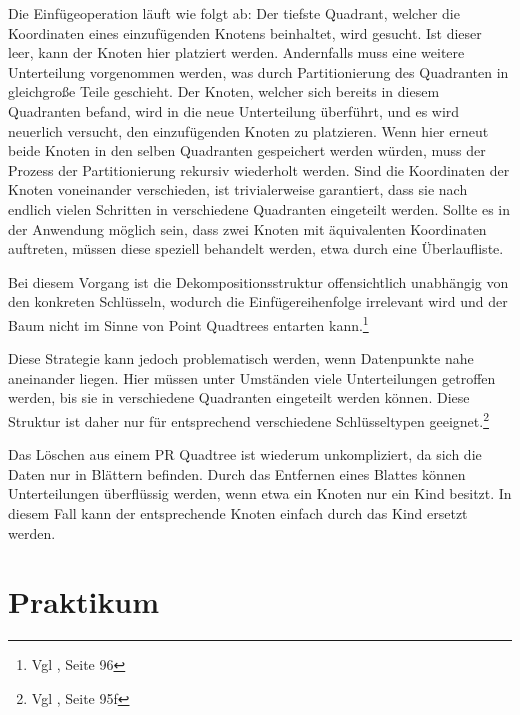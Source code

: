 \documentclass[%
			paper=a4,%
			DIV12,
			liststotoc,
			bibtotoc,
			draft=false,%
			titlepage,
			numbers=noendperiod
			]{scrartcl}
\newcommand{\zit}[3]{#1 \cite{#2}, #3}
\newcommand{\footzit}[3]{\footnote{\zit{#1}{#2}{#3}}}
\begin{document}
Die Einfügeoperation läuft wie folgt ab:
Der tiefste Quadrant, welcher die Koordinaten eines einzufügenden Knotens beinhaltet, wird gesucht.
Ist dieser leer, kann der Knoten hier platziert werden.
Andernfalls muss eine weitere Unterteilung vorgenommen werden, was durch Partitionierung des Quadranten in gleichgroße Teile geschieht. 
Der Knoten, welcher sich bereits in diesem Quadranten befand, wird in die neue Unterteilung überführt, und es wird neuerlich versucht, den einzufügenden Knoten zu platzieren. 
Wenn hier erneut beide Knoten in den selben Quadranten gespeichert werden würden, muss der Prozess der Partitionierung rekursiv wiederholt werden.
Sind die Koordinaten der Knoten voneinander verschieden, ist trivialerweise garantiert, dass sie nach endlich vielen Schritten in verschiedene Quadranten eingeteilt werden. 
Sollte es in der Anwendung möglich sein, dass zwei Knoten mit äquivalenten Koordinaten auftreten, müssen diese speziell behandelt werden, etwa durch eine Überlaufliste.


Bei diesem Vorgang ist die Dekompositionsstruktur offensichtlich unabhängig von den konkreten Schlüsseln, wodurch die Einfügereihenfolge irrelevant wird und der Baum nicht im Sinne von Point Quadtrees entarten kann.\footzit{Vgl}{Samet90}{Seite 96}

Diese Strategie kann jedoch problematisch werden, wenn Datenpunkte nahe aneinander liegen.
Hier müssen unter Umständen viele Unterteilungen getroffen werden, bis sie in verschiedene Quadranten eingeteilt werden können. 
Diese Struktur ist daher nur für entsprechend verschiedene Schlüsseltypen geeignet.\footzit{Vgl}{Samet90}{Seite 95f}

Das Löschen aus einem PR Quadtree ist wiederum unkompliziert, da sich die Daten nur in Blättern befinden.
Durch das Entfernen eines Blattes können Unterteilungen überflüssig werden, wenn etwa ein Knoten nur ein Kind besitzt.
In diesem Fall kann der entsprechende Knoten einfach durch das Kind ersetzt werden.

\newpage
\part{Praktikum}
\end{document}
